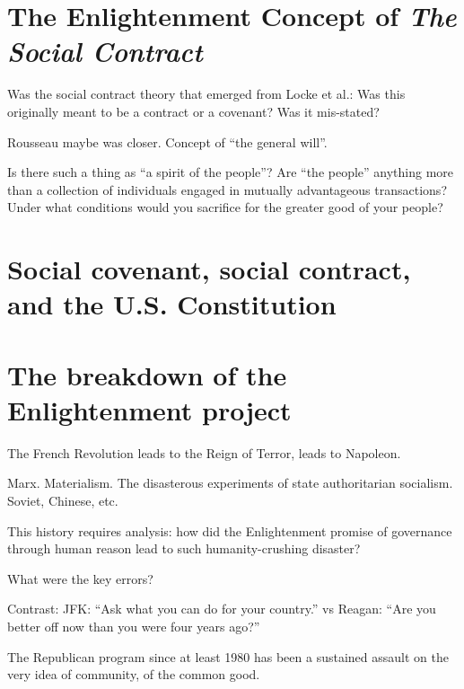\documentclass[
]{book}
\begin{document}
\hypertarget{the-enlightenment-concept-of-the-social-contract}{%
\chapter{\texorpdfstring{The Enlightenment Concept of \emph{The Social Contract}}{The Enlightenment Concept of The Social Contract}}\label{the-enlightenment-concept-of-the-social-contract}}

Was the social contract theory that emerged from Locke et al.: Was this
originally meant to be a contract or a covenant? Was it mis-stated?

Rousseau maybe was closer. Concept of ``the general will''.

Is there such a thing as ``a spirit of the people''?
Are ``the people'' anything more than a collection of individuals engaged in mutually advantageous transactions?
Under what conditions would you sacrifice for the greater good of your people?

\hypertarget{social-covenant-social-contract-and-the-u.s.-constitution}{%
\chapter{Social covenant, social contract, and the U.S. Constitution}\label{social-covenant-social-contract-and-the-u.s.-constitution}}

\hypertarget{the-breakdown-of-the-enlightenment-project}{%
\chapter{The breakdown of the Enlightenment project}\label{the-breakdown-of-the-enlightenment-project}}

The French Revolution leads to the Reign of Terror, leads to Napoleon.

Marx. Materialism. The disasterous experiments of state authoritarian socialism. Soviet, Chinese, etc.

This history requires analysis: how did the Enlightenment promise of governance through human reason lead to such humanity-crushing disaster?

What were the key errors?

Contrast:
JFK: ``Ask what you can do for your country.''
vs Reagan: ``Are you better off now than you were four years ago?''

The Republican program since at least 1980 has been a sustained assault on the very idea of community, of the common good.
\end{document}
